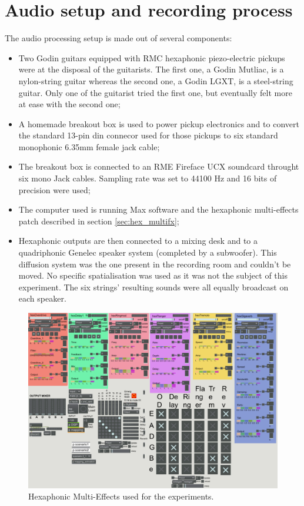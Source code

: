 \documentclass{article}
\begin{document}
\section{Audio setup and recording process}\label{sec:setup}
The audio processing setup is made out of several components: 
\begin{itemize}
    \item Two Godin guitars equipped with RMC hexaphonic piezo-electric pickups were at the disposal of the guitarists. 
    The first one, a Godin Mutliac, is a nylon-string guitar whereas the second one, a Godin LGXT, is a steel-string 
    guitar. Only one of the guitarist tried the first one, but eventually felt more at ease with the second one;
    \item A homemade breakout box is used to power pickup electronics and to convert the standard 13-pin din connecor 
    used for those pickups to six standard monophonic 6.35mm female jack cable;
    \item The breakout box is connected to an RME Fireface UCX soundcard throught six mono Jack cables. Sampling rate was 
    set to 44100 Hz and 16 bits of precision were used;
	\item The computer used is running Max software and the hexaphonic multi-effects patch described in section \ref{sec:hex_multifx};
    \item Hexaphonic outputs are then connected to a mixing desk and to a quadriphonic Genelec speaker system (completed by a
    subwoofer). This diffusion system was the one present in the recording room and couldn't be moved. No specific
    spatialisation was used as it was not the subject of this experiment. The six strings' resulting sounds were all equally broadcast on each speaker.
    
\end{itemize}

\begin{figure}
    \centering
    \includegraphics[scale=0.3]{figures/191025-Patch-experience.png}
    \caption{Hexaphonic Multi-Effects used for the experiments.}
    \label{fig:hex-multi-effects}
\end{figure}
\end{document}
